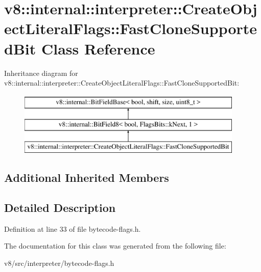 \hypertarget{classv8_1_1internal_1_1interpreter_1_1CreateObjectLiteralFlags_1_1FastCloneSupportedBit}{}\section{v8\+:\+:internal\+:\+:interpreter\+:\+:Create\+Object\+Literal\+Flags\+:\+:Fast\+Clone\+Supported\+Bit Class Reference}
\label{classv8_1_1internal_1_1interpreter_1_1CreateObjectLiteralFlags_1_1FastCloneSupportedBit}
Inheritance diagram for v8\+:\+:internal\+:\+:interpreter\+:\+:Create\+Object\+Literal\+Flags\+:\+:Fast\+Clone\+Supported\+Bit\+:\begin{figure}[H]
\begin{center}
\leavevmode
\includegraphics[height=3.000000cm]{classv8_1_1internal_1_1interpreter_1_1CreateObjectLiteralFlags_1_1FastCloneSupportedBit}
\end{center}
\end{figure}
\subsection*{Additional Inherited Members}


\subsection{Detailed Description}


Definition at line 33 of file bytecode-\/flags.\+h.



The documentation for this class was generated from the following file\+:\begin{DoxyCompactItemize}
\item 
v8/src/interpreter/bytecode-\/flags.\+h\end{DoxyCompactItemize}
